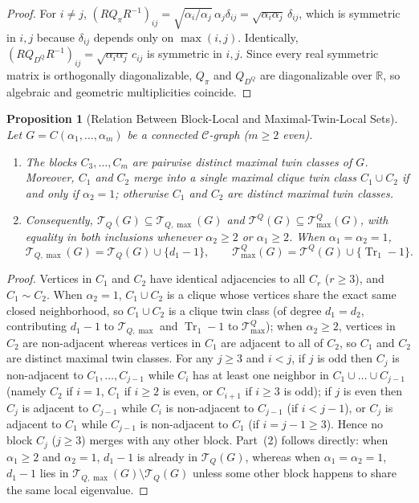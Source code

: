 \documentclass[11pt,a4paper]{article}
\newtheorem{proposition}[theorem]{Proposition}
\theoremstyle{definition}
\DeclareMathOperator{\Tr}{Tr}
\begin{document}
\begin{proof}
  For $i \ne j$, $(R Q_\pi R^{-1})_{ij} = \sqrt{\alpha_i / \alpha_j}\,\alpha_j \delta_{ij} = \sqrt{\alpha_i \alpha_j}\,\delta_{ij}$, which is symmetric in $i, j$ because $\delta_{ij}$ depends only on $\max(i,j)$. Identically, $(R Q_{D^Q} R^{-1})_{ij} = \sqrt{\alpha_i \alpha_j}\,c_{ij}$ is symmetric in $i, j$. Since every real symmetric matrix is orthogonally diagonalizable, $Q_\pi$ and $Q_{D^Q}$ are diagonalizable over $\mathbb{R}$, so algebraic and geometric multiplicities coincide.
\end{proof}

\begin{proposition}[Relation Between Block-Local and Maximal-Twin-Local Sets]\label{prop:local_rel}
  Let $G = C(\alpha_1,\dots,\alpha_m)$ be a connected $\mathcal{C}$-graph ($m \ge 2$ even).
  \begin{enumerate}
    \item The blocks $C_3,\dots,C_m$ are pairwise distinct maximal twin classes of $G$. Moreover, $C_1$ and $C_2$ merge into a single maximal clique twin class $C_1 \cup C_2$ if and only if $\alpha_2 = 1$; otherwise $C_1$ and $C_2$ are distinct maximal twin classes.
    \item Consequently, $\mathcal{T}_Q(G) \subseteq \mathcal{T}_{Q,\max}(G)$ and $\mathcal{T}^Q(G) \subseteq \mathcal{T}^Q_{\max}(G)$, with equality in both inclusions whenever $\alpha_2 \ge 2$ or $\alpha_1 \ge 2$. When $\alpha_1 = \alpha_2 = 1$,
    \[
      \mathcal{T}_{Q,\max}(G) = \mathcal{T}_Q(G) \cup \{d_1 - 1\}, \qquad
      \mathcal{T}^Q_{\max}(G) = \mathcal{T}^Q(G) \cup \{\Tr_1 - 1\}.
    \]
  \end{enumerate}
\end{proposition}

\begin{proof}
  Vertices in $C_1$ and $C_2$ have identical adjacencies to all $C_r$ ($r \ge 3$), and $C_1 \sim C_2$. When $\alpha_2 = 1$, $C_1 \cup C_2$ is a clique whose vertices share the exact same closed neighborhood, so $C_1 \cup C_2$ is a clique twin class (of degree $d_1 = d_2$, contributing $d_1 - 1$ to $\mathcal{T}_{Q,\max}$ and $\Tr_1 - 1$ to $\mathcal{T}^Q_{\max}$); when $\alpha_2 \ge 2$, vertices in $C_2$ are non-adjacent whereas vertices in $C_1$ are adjacent to all of $C_2$, so $C_1$ and $C_2$ are distinct maximal twin classes. For any $j \ge 3$ and $i < j$, if $j$ is odd then $C_j$ is non-adjacent to $C_1,\dots,C_{j-1}$ while $C_i$ has at least one neighbor in $C_1 \cup \dots \cup C_{j-1}$ (namely $C_2$ if $i=1$, $C_1$ if $i \ge 2$ is even, or $C_{i+1}$ if $i \ge 3$ is odd); if $j$ is even then $C_j$ is adjacent to $C_{j-1}$ while $C_i$ is non-adjacent to $C_{j-1}$ (if $i < j-1$), or $C_j$ is adjacent to $C_1$ while $C_{j-1}$ is non-adjacent to $C_1$ (if $i = j-1 \ge 3$). Hence no block $C_j$ ($j \ge 3$) merges with any other block. Part~(2) follows directly: when $\alpha_1 \ge 2$ and $\alpha_2 = 1$, $d_1 - 1$ is already in $\mathcal{T}_Q(G)$, whereas when $\alpha_1 = \alpha_2 = 1$, $d_1 - 1$ lies in $\mathcal{T}_{Q,\max}(G) \setminus \mathcal{T}_Q(G)$ unless some other block happens to share the same local eigenvalue.
\end{proof}
\end{document}
